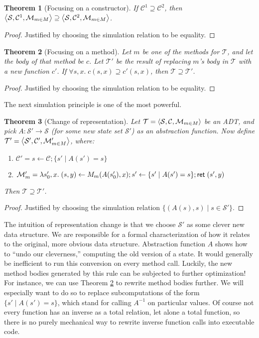 \documentclass{amsbook}
\newtheorem{theorem}{Theorem}[chapter]
\theoremstyle{definition}
\theoremstyle{remark}
\numberwithin{section}{chapter}
\numberwithin{equation}{chapter}
\begin{document}
\begin{theorem}[Focusing on a constructor]
  If $\mathcal C^1 \supseteq \mathcal C^2$, then ${\left \langle \mathcal S, \mathcal C^1, \mathcal M_{m \in M} \right \rangle} \supseteq {\left \langle \mathcal S, \mathcal C^2, \mathcal M_{m \in M} \right \rangle}$.
\end{theorem}
\begin{proof}
  Justified by choosing the simulation relation to be equality.
\end{proof}

\begin{theorem}[Focusing on a method]\label{refinemethod}
  Let $m$ be one of the methods for $\mathcal T$, and let the body of that method be $c$.
  Let $\mathcal T'$ be the result of replacing $m$'s body in $\mathcal T$ with a new function $c'$.
  If $\forall s, x. \; c(s, x) \supseteq c'(s, x)$, then $\mathcal T \supseteq \mathcal T'$.
\end{theorem}
\begin{proof}
  Justified by choosing the simulation relation to be equality.
\end{proof}

The next simulation principle is one of the most powerful.

\begin{theorem}[Change of representation]\label{repchange}
  Let $\mathcal T = {\left \langle \mathcal S, \mathcal C, \mathcal M_{m \in M} \right \rangle}$ be an ADT, and pick $A : \mathcal S' \to \mathcal S$ (for some new state set $\mathcal S'$) as an \emph{abstraction function}.
  Now define $\mathcal T' = {\left \langle \mathcal S', \mathcal C', \mathcal M'_{m \in M} \right \rangle}$, where:
  \begin{enumerate}
  \item $\mathcal C' = s \leftarrow \mathcal C; \{s' \mid A(s') = s\}$
  \item $\mathcal M'_m = \lambda s'_0, x. \; \mathcal (s, y) \leftarrow M_m(A(s'_0), x); s' \leftarrow \{s' \mid A(s') = s\}; \mathsf{ret} \; (s', y)$
  \end{enumerate}
  Then $\mathcal T \supseteq \mathcal T'$.
\end{theorem}
\begin{proof}
  Justified by choosing the simulation relation $\{(A(s), s) \mid s \in \mathcal S'\}$.
\end{proof}

The intuition of representation change is that we choose $\mathcal S'$ as some clever new data structure.
We are responsible for a formal characterization of how it relates to the original, more obvious data structure.
Abstraction function $A$ shows how to ``undo our cleverness,'' computing the old version of a state.
It would generally be inefficient to run this conversion on every method call.
Luckily, the new method bodies generated by this rule can be subjected to further optimization!
For instance, we can use Theorem \ref{refinemethod} to rewrite method bodies further.
We will especially want to do so to replace subcomputations of the form $\{s' \mid A(s') = s\}$, which stand for calling $A^{-1}$ on particular values.
Of course not every function has an inverse as a total relation, let alone a total function, so there is no purely mechanical way to rewrite inverse function calls into executable code.
\end{document}
